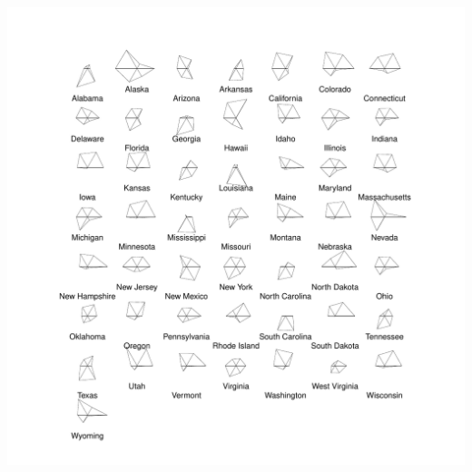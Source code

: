 \documentclass[
]{article}
\begin{document}
\includegraphics{modern_applied_statistics_CH11_files/figure-latex/unnamed-chunk-18-1.pdf}

\newpage
\end{document}
